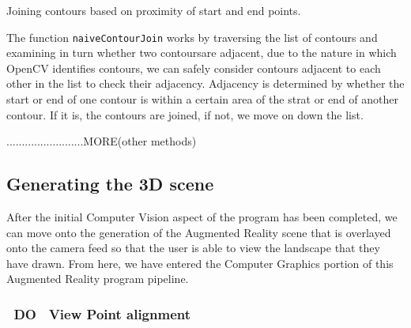 \documentclass[11pt]{article}
\begin{document}
\begin{algorithm}
\DontPrintSemicolon
{}
\caption{Joining contours based on proximity of start and end points.}
\label{algo:naivecontourjoin}
\end{algorithm}

The function \texttt{naiveContourJoin} works by traversing the list of 
contours and examining in turn whether two contoursare adjacent, due to 
the nature in which OpenCV identifies contours, we can safely consider 
contours adjacent to each other in the list to check their adjacency. 
Adjacency is determined by whether the start or end of one contour is within
a certain area of the strat or end of another contour. If it is, the 
contours are joined, if not, we move on down the list.

.........................MORE(other methods)




\subsection{Generating the 3D scene}
After the initial Computer Vision aspect of the program has been completed,
we can move onto the generation of the Augmented Reality scene that is
overlayed onto the camera feed so that the user is able to view the
landscape that they have drawn. From here, we have entered the Computer
Graphics portion of this Augmented Reality program pipeline.
\subsubsection{~DO~ View Point alignment}
\end{document}
